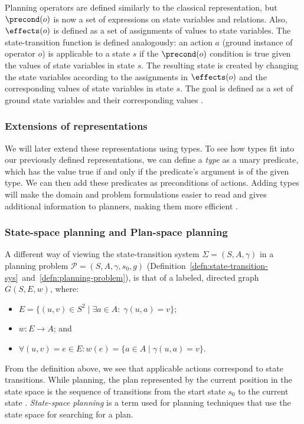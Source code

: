 Planning operators are defined similarly to the classical representation, but
$\precond(o)$ is now a set of expressions on state variables and relations.
Also, $\effects(o)$ is defined as a set of assignments of values to state variables.
The state-transition function is defined analogously: an action $a$ (ground instance
of operator $o$)
is applicable to a state $s$ if the $\precond(o)$ condition is true given the values
of state variables in state $s$. The resulting state is created by changing the state variables
according to the assignments in $\effects(o)$ and the corresponding values of state
variables in state $s$.
The goal is defined as a set of ground state variables and their corresponding values
\citep[Section~2.5.2]{Ghallab2004}.


\subsubsection{Extensions of representations}

We will later extend these representations using types.
To see how types fit into our previously defined representations, we can
define a \textit{type} as a unary predicate, which has the value true
if and only if the predicate's argument is of the given type.
We can then add these predicates as preconditions of actions.
Adding types will make the domain and problem formulations
easier to read and gives additional information
to planners, making them more efficient \citep[Section 2.4.1]{Ghallab2004}.

\subsubsection{State-space planning and Plan-space planning}

A different way of viewing the state-transition system $\Sigma = (S, A, \gamma)$ in a
planning problem $\mathcal{P} = (S, A, \gamma, s_0, g)$ (Definition~\ref{defn:state-transition-sys}~and~\ref{defn:planning-problem}), is that of a labeled, directed graph $G(S, E, w)$, where:
\begin{itemize}
\item $E = \{(u, v) \in S^2 \;|\; \exists a \in A : \; \gamma(u, a) = v\}$;
\item $w: E \to A$; and
\item $\forall (u, v) = e \in E : w(e) = \{a \in A \;|\; \gamma(u, a) = v\}$. 
\end{itemize}
From the definition above, we see that applicable actions correspond to state transitions. While planning, the plan represented by the current position in
the state space is the sequence of transitions from the start
state $s_0$ to the current state \citep[Section~4.1]{Ghallab2004}.
\textit{State-space planning} is a term used for planning techniques
that use the state space for searching for a plan.

